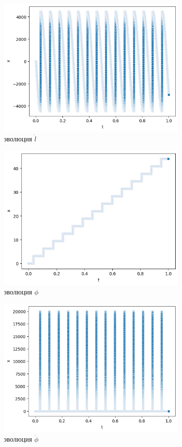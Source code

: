 \documentclass[a4paper, 12pt]{article}
\begin{document}
 \begin{figure}[H]
  \centering
  \includegraphics[width = 0.85\textwidth, height = 0.20\textheight]{pictures/data/image copy 2.png}
  \caption{эволюция $\dot{l}$}
 \end{figure}
    
    \newpage
    
    \begin{figure}[H]
  \centering
  \includegraphics[width = 0.85\textwidth, height = 0.20\textheight]{pictures/data/image copy 3.png}
  \caption{эволюция $\phi$}
 \end{figure}

    \begin{figure}[H]
  \centering
  \includegraphics[width = 0.85\textwidth, height = 0.20\textheight]{pictures/data/image copy 4.png}
  \caption{эволюция $\dot{\phi}$}
 \end{figure}
\end{document}
